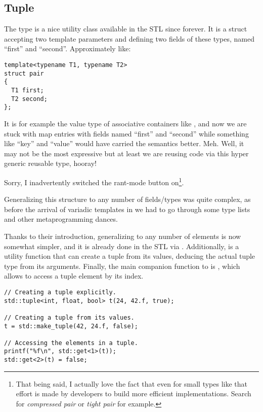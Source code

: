 \subsection{Tuple}
\label{sec:tuple}

The type  is a nice utility class available in the STL
since forever. It is a struct accepting two template parameters and
defining two fields of these types, named ``first'' and
``second''. Approximately like:

\begin{lstlisting}
template<typename T1, typename T2>
struct pair
{
  T1 first;
  T2 second;
};
\end{lstlisting}

It is for example the value type of associative containers like
, and now we are stuck with map entries with fields
named ``first'' and ``second'' while something like ``key'' and
``value'' would have carried the semantics better. Meh. Well, it may
not be the most expressive but at least we are reusing code via this
hyper generic reusable type, hooray!

Sorry, I inadvertently switched the rant-mode button on\footnote{That
  being said, I actually love the fact that even for small types like
  that effort is made by \cpp{} developers to build more efficient
  implementations. Search for \emph{compressed pair} or \emph{tight
    pair} for example.}.

\bigskip

Generalizing this structure to any number of fields/types was quite
complex, as before the arrival of variadic templates
 in  we had to go through some type lists
and other metaprogramming dances.

%
%
Thanks to their introduction, generalizing  to any
number of elements is now somewhat simpler, and it is already done in
the STL via . Additionally, 
is a utility function that can create a tuple from its values,
deducing the actual tuple type from its arguments. Finally, the main
companion function to  is , which
allows to access a tuple element by its index.

\begin{lstlisting}
// Creating a tuple explicitly.
std::tuple<int, float, bool> t(24, 42.f, true);

// Creating a tuple from its values.
t = std::make_tuple(42, 24.f, false);

// Accessing the elements in a tuple.
printf("%f\n", std::get<1>(t));
std::get<2>(t) = false;
\end{lstlisting}

